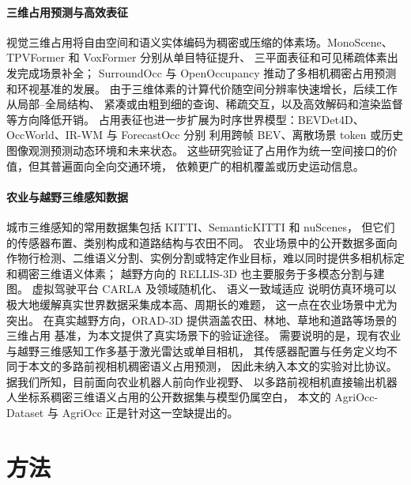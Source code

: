 \documentclass[a4paper,fleqn]{cas-sc}
\begin{document}
\paragraph{三维占用预测与高效表征}
视觉三维占用将自由空间和语义实体编码为稠密或压缩的体素场。MonoScene、TPVFormer 和 VoxFormer 分别从单目特征提升、
三平面表征和可见稀疏体素出发完成场景补全\citep{cao2022monoscene,huang2023tpvformer,li2023voxformer}；
SurroundOcc 与 OpenOccupancy 推动了多相机稠密占用预测和环视基准的发展\citep{wei2023surroundocc,wang2023openoccupancy}。
由于三维体素的计算代价随空间分辨率快速增长，后续工作从局部--全局结构、
紧凑或由粗到细的查询、稀疏交互，以及高效解码和渲染监督等方向降低开销\citep{zhang2023occformer,ma2024cotr,wang2024panoocc,liu2024sparseocc,tang2024sparseocc,yu2023flashocc,pan2024renderocc}。
占用表征也进一步扩展为时序世界模型：BEVDet4D、OccWorld、IR-WM 与 ForecastOcc 分别
利用跨帧 BEV、离散场景 token 或历史图像观测预测动态环境和未来状态\citep{huang2022bevdet4d,zheng2024occworld,mei2025irwm,mohan2026forecastocc}。
这些研究验证了占用作为统一空间接口的价值，但其普遍面向全向交通环境，
依赖更广的相机覆盖或历史运动信息。

\paragraph{农业与越野三维感知数据}
城市三维感知的常用数据集包括 KITTI\citep{geiger2012kitti}、SemanticKITTI\citep{behley2019semantickitti} 和 nuScenes\citep{caesar2020nuscenes}，
但它们的传感器布置、类别构成和道路结构与农田不同。
农业场景中的公开数据多面向作物行检测、二维语义分割、实例分割或特定作业目标，难以同时提供多相机标定和稠密三维语义体素；
越野方向的 RELLIS-3D\citep{jiang2020rellis} 也主要服务于多模态分割与建图。
虚拟驾驶平台 CARLA\citep{dosovitskiy2017carla} 及领域随机化\citep{tobin2017domainrandomization,peng2018sim2real}、
语义一致域适应\citep{hoffman2018cycada} 说明仿真环境可以极大地缓解真实世界数据采集成本高、周期长的难题，
这一点在农业场景中尤为突出。
在真实越野方向，ORAD-3D 提供涵盖农田、林地、草地和道路等场景的三维占用
基准\citep{chen2025orad3d}，为本文提供了真实场景下的验证途径。
需要说明的是，现有农业与越野三维感知工作多基于激光雷达或单目相机，
其传感器配置与任务定义均不同于本文的多路前视相机稠密语义占用预测，
因此未纳入本文的实验对比协议。据我们所知，目前面向农业机器人前向作业视野、
以多路前视相机直接输出机器人坐标系稠密三维语义占用的公开数据集与模型仍属空白，
本文的 AgriOcc-Dataset 与 AgriOcc 正是针对这一空缺提出的。

\section{方法}\label{sec:method}
\end{document}
